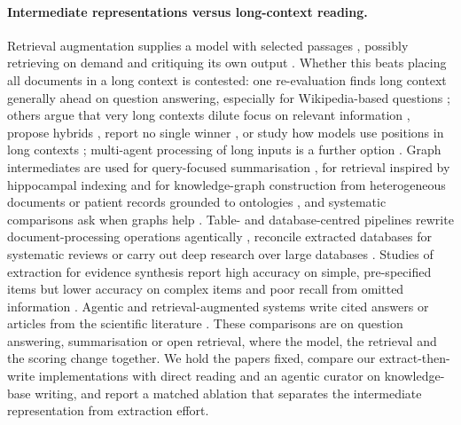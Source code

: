 \documentclass{article} %
\begin{document}
\paragraph{Intermediate representations versus long-context reading.}
Retrieval augmentation supplies a model with selected passages \citep{Lewis2020RetrievalaugmentedGeneration}, possibly retrieving on demand and critiquing its own output \citep{Asai2023SelfragLearning}. Whether this beats placing all documents in a long context is contested: one re-evaluation finds long context generally ahead on question answering, especially for Wikipedia-based questions \citep{Li2024LongContext}; others argue that very long contexts dilute focus on relevant information \citep{Yu2024DefenseRag}, propose hybrids \citep{li2024retrieval}, report no single winner \citep{Li2025LaraBenchmarking}, or study how models use positions in long contexts \citep{liu2024lost}; multi-agent processing of long inputs is a further option \citep{Zhang2024ChainAgents}. Graph intermediates are used for query-focused summarisation \citep{edge2024local}, for retrieval inspired by hippocampal indexing \citep{Gutirrez2024HipporagNeurobiologically} and for knowledge-graph construction from heterogeneous documents \citep{Sun2024Docs2kgUnified} or patient records grounded to ontologies \citep{Kim2024StructuredExtraction}, and systematic comparisons ask when graphs help \citep{han2025rag,xiang2025use}. Table- and database-centred pipelines rewrite document-processing operations agentically \citep{shankar2025docetl}, reconcile extracted databases for systematic reviews \citep{joshi2026sliders} or carry out deep research over large databases \citep{liu2026datastorm}. Studies of extraction for evidence synthesis report high accuracy on simple, pre-specified items \citep{Konet2024PerformanceTwo,Stewartevans2025ExpeditingData} but lower accuracy on complex items and poor recall from omitted information \citep{Stewartevans2025ExpeditingData,Li2025WhatLevel}. Agentic and retrieval-augmented systems write cited answers or articles from the scientific literature \citep{Lla2023PaperqaRetrievalaugmented,Asai2024OpenscholarSynthesizing,shao2024assisting,singh2025ai2,skarlinski2024language}. These comparisons are on question answering, summarisation or open retrieval, where the model, the retrieval and the scoring change together. We hold the papers fixed, compare our extract-then-write implementations with direct reading and an agentic curator on knowledge-base writing, and report a matched ablation that separates the intermediate representation from extraction effort.
\end{document}
